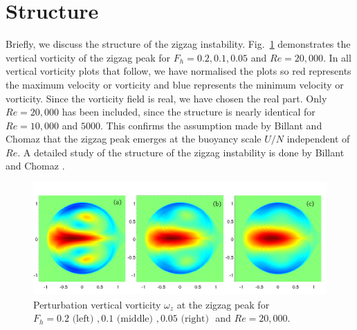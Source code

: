 \section{Structure} 
Briefly, we discuss the structure of the zigzag instability. Fig.~\ref{zigzag_vorticity} demonstrates the vertical vorticity of the zigzag peak for $F_{h}=0.2,0.1,0.05$ and $Re=20{,}000$. In all vertical vorticity plots that follow, we have normalised the plots so red represents the maximum velocity or vorticity and blue represents the minimum velocity  or vorticity. Since the vorticity field is real, we have chosen the real part. Only $Re=20{,}000$ has been included, since the structure is nearly identical for $Re=10{,}000$ and $5000$. This confirms the assumption made by Billant and Chomaz \cite{bc2000b} that the zigzag peak emerges at the buoyancy scale $U/N$ independent of $Re$. A detailed study of the structure of the zigzag instability is done by Billant and Chomaz \cite{bc2000c}. 
\begin{figure} 
\begin{center}
\includegraphics[width=\textwidth]{vorticity_zigzag}
\caption{Perturbation vertical vorticity $\omega_{z}$ at the zigzag peak for $F_{h}=0.2 \text{ (left) }, 0.1 \text{ (middle) }, 0.05 \text{ (right) }$ and $Re=20{,}000$.}
\label{zigzag_vorticity}
\end{center}
\end{figure} 
